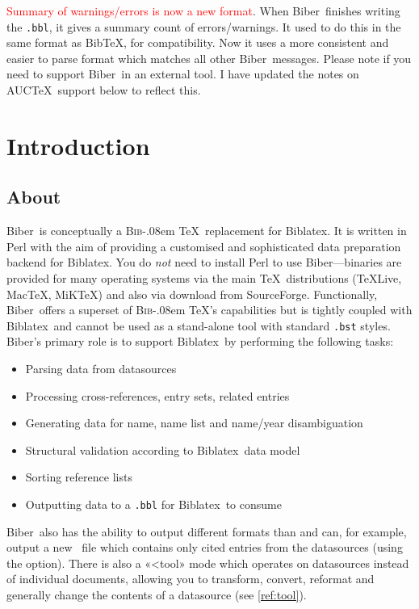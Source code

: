 \documentclass{ltxdockit}
\def\BibTeX{\textsc{Bib}\kern-.08em \TeX}
\newcommand*{\biber}{Biber\xspace}
\newcommand*{\biblatex}{Biblatex\xspace}
\begin{document}
\noindent \textcolor{red}{Summary of warnings/errors is now a new format}.
When \biber\ finishes writing the \verb+.bbl+, it gives a summary
count of errors/warnings. It used to do this in the same format as
Bib\TeX, for compatibility. Now it uses a more consistent and easier
to parse format which matches all other \biber\ messages. Please note
if you need to support \biber\ in an external tool. I have updated the
notes on AUC\TeX\ support below to reflect this.

\section{Introduction}\label{int}

\subsection{About}

\biber\ is conceptually a \BibTeX\ replacement for
\biblatex. It is written in Perl with the aim of providing a
customised and sophisticated data preparation backend for \biblatex.
You do \emph{not} need to install Perl to use \biber---binaries
are provided for many operating systems via the main \TeX\
distributions (\TeX Live, Mac\TeX, MiK\TeX) and also via download from SourceForge.
Functionally, \biber\ offers a superset of \BibTeX's capabilities but is
tightly coupled with \biblatex\ and cannot be used as a stand-alone tool
with standard \verb+.bst+ styles. \biber's primary role is to support
\biblatex\ by performing the following tasks:

\begin{itemize}
\item Parsing data from datasources
\item Processing cross-references, entry sets, related entries
\item Generating data for name, name list and name/year disambiguation
\item Structural validation according to \biblatex\ data model
\item Sorting reference lists
\item Outputting data to a \verb+.bbl+ for \biblatex\ to consume
\end{itemize}

\biber\ also has the ability to output different formats than 
and can, for example, output a new \bibtex\ file which contains only
cited entries from the datasources (using the 
option). There is also a «<tool» mode which operates on datasources instead
of individual documents, allowing you to transform, convert, reformat and
generally change the contents of a datasource (see \ref{ref:tool}).
\end{document}

